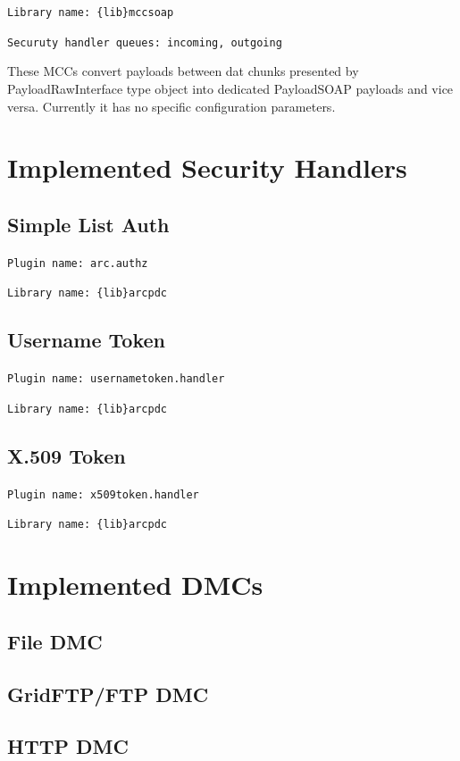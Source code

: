 \documentclass{book}
\begin{document}
\texttt{Library name: \{lib\}mccsoap}

\texttt{Securuty handler queues: incoming, outgoing}


These MCCs convert payloads between dat chunks presented by PayloadRawInterface type object into dedicated PayloadSOAP payloads and vice versa. Currently it has no specific configuration parameters.


\section{Implemented Security Handlers}


\subsection{Simple List Auth}

\texttt{Plugin name: arc.authz}

\texttt{Library name: \{lib\}arcpdc}


\subsection{Username Token}

\texttt{Plugin name: usernametoken.handler}

\texttt{Library name: \{lib\}arcpdc}


\subsection{X.509 Token}

\texttt{Plugin name: x509token.handler}

\texttt{Library name: \{lib\}arcpdc}


\section{Implemented DMCs}


\subsection{File DMC}


\subsection{GridFTP/FTP DMC}


\subsection{HTTP DMC}
\end{document}
